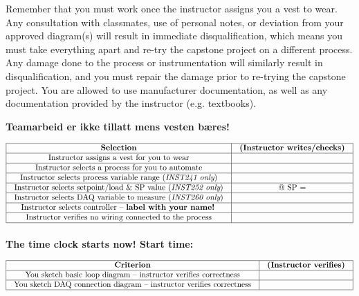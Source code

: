 \vskip 10pt

Remember that you must work  once the instructor assigns you a vest to wear.  Any consultation with classmates, use of personal notes, or deviation from your approved diagram(s) will result in immediate disqualification, which means you must take everything apart and re-try the capstone project on a different process.  Any damage done to the process or instrumentation will similarly result in disqualification, and you must repair the damage prior to re-trying the capstone project.  You are allowed to use manufacturer documentation, as well as any documentation provided by the instructor (e.g. textbooks).

\vskip 20pt

\centerline{\bf Teamarbeid er ikke tillatt mens vesten bæres!}

\vskip 10pt


$$\vbox{\offinterlineskip
\halign{\strut
\vrule \quad\hfil # \ \hfil & 
\vrule \quad\hfil # \ \hfil \vrule \cr
\noalign{\hrule}
%
{\bf Selection} & {\bf (Instructor writes/checks)} \cr
%
\noalign{\hrule}
%
Instructor assigns a vest for you to wear &  \cr
%
\noalign{\hrule}
%
Instructor selects a process for you to automate &  \cr
%
\noalign{\hrule}
%
Instructor selects process variable range ({\it INST241 only}) &  \cr
%
\noalign{\hrule}
%
Instructor selects setpoint/load \& SP value ({\it INST252 only}) & @ SP =  \cr
%
\noalign{\hrule}
%
Instructor selects DAQ variable to measure ({\it INST260 only}) &  \cr
%
\noalign{\hrule}
%
Instructor selects controller -- {\bf label with your name!} &  \cr
%
\noalign{\hrule}
%
Instructor verifies no wiring connected to the process &  \cr
%
\noalign{\hrule}
} %
}$$ %

\vskip 10pt

\centerline{\bf The time clock starts now! \hskip 50pt Start time: \underbar{\hskip 80pt}}

\vskip 10pt


$$\vbox{\offinterlineskip
\halign{\strut
\vrule \quad\hfil # \ \hfil & 
\vrule \quad\hfil # \ \hfil \vrule \cr
\noalign{\hrule}
%
{\bf Criterion} & {\bf (Instructor verifies)} \cr
%
\noalign{\hrule}
%
You sketch basic loop diagram -- instructor verifies correctness &  \cr
%
\noalign{\hrule}
%
You sketch DAQ connection diagram -- instructor verifies correctness &  \cr
%
\noalign{\hrule}
} %
}$$ %

